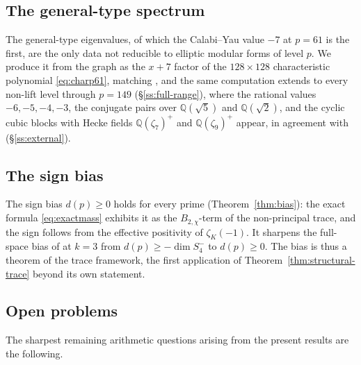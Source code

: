 \documentclass[11pt]{amsart}
\theoremstyle{plain}
\theoremstyle{definition}
\newcommand{\Q}{\mathbb{Q}}
\begin{document}
	\subsection{The general-type spectrum}
	
	The general-type eigenvalues, of which the Calabi--Yau value $-7$ at
	$p=61$ is the first, are the only data not reducible to elliptic modular
	forms of level $p$. We produce it from the graph as the $x+7$ factor of
	the $128\times128$ characteristic polynomial \eqref{eq:charp61}, matching
	\cite{PoorYuen2015}, and the same computation extends to every non-lift
	level through $p=149$ (\S\ref{ss:full-range}), where the rational values
	$-6,-5,-4,-3$, the conjugate pairs over $\Q(\sqrt5)$ and $\Q(\sqrt2)$,
	and the cyclic cubic blocks with Hecke fields $\Q(\zeta_7)^+$ and
	$\Q(\zeta_9)^+$ appear, in agreement with \cite{ALRTV}
	(\S\ref{ss:external}).
	
	\subsection{The sign bias}
	
	The sign bias $d(p)\ge0$ holds for every prime (Theorem~\ref{thm:bias}):
	the exact formula \eqref{eq:exactmass} exhibits it as the
	$B_{2,\chi}$-term of the non-principal trace, and the sign follows from
	the effective positivity of $\zeta_K(-1)$. It sharpens the full-space
	bias of \cite[Thm.~7.1]{Ibukiyama-dim} at $k=3$ from $d(p)\ge-\dim S_4^{-}$
	to $d(p)\ge0$. The bias is thus a theorem of
	the trace framework, the first application of
	Theorem~\ref{thm:structural-trace} beyond its own statement.
	
	\subsection{Open problems}
	
	The sharpest remaining arithmetic questions arising from the present results are the following.
	
\end{document}
